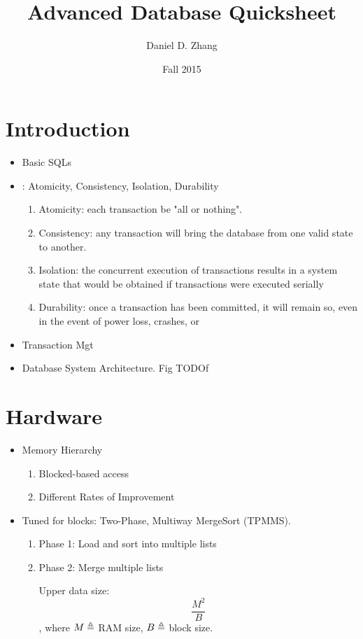 \documentclass{article}
\begin{document}
\title{Advanced Database Quicksheet}
\author{Daniel D. Zhang}
\date{Fall 2015}
\maketitle


\tableofcontents
\newpage

\section{Introduction}
\begin{itemize}
\item Basic SQLs 
\item {}: Atomicity, Consistency, Isolation, Durability 
\begin{enumerate}
\item Atomicity: each transaction be "all or nothing".
\item Consistency: any transaction will bring the database from one valid state to
another.
\item Isolation: the concurrent execution of transactions results in a system state
that would be obtained if transactions were executed serially
\item Durability: once a transaction has been committed, it will remain so, even in
the event of power loss, crashes, or 
\end{enumerate}
\item Transaction Mgt
\item Database System Architecture. Fig TODOf
\end{itemize}


\section{Hardware}
\begin{itemize}
\item Memory Hierarchy 
\begin{enumerate}
\item Blocked-based access 
\item Different Rates of Improvement 
\end{enumerate}
\item Tuned for blocks: Two-Phase, Multiway MergeSort (TPMMS). 
\begin{enumerate}
\item Phase 1: Load and sort into multiple lists 
\item Phase 2: Merge multiple lists 

Upper data size: 
$$
\frac{M^2}{B}
$$
, where $M\triangleq$ RAM size, $B\triangleq$ block size. 
\end{enumerate}
\end{itemize}
\end{document}
